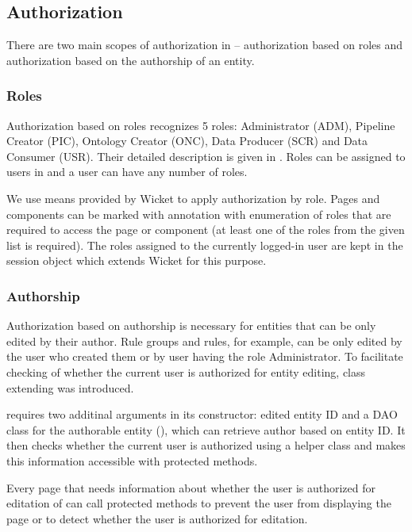 \begin{description}[style=nextline,font=\ttfamily]
\subsection{Authorization}
There are two main scopes of authorization in \odcs -- authorization based on roles and authorization based on the authorship of an entity.

\subsubsection{Roles}
Authorization based on roles recognizes 5 roles: Administrator (ADM), Pipeline Creator (PIC), Ontology Creator (ONC), Data Producer (SCR) and Data Consumer (USR). Their detailed description is given in . Roles can be assigned to users in \FE and a user can have any number of roles.

We use means provided by Wicket to apply authorization by role. Pages and components can be marked with  annotation with enumeration of roles that are required to access the page or component (at least one of the roles from the given list is required). The roles assigned to the currently logged-in user are kept in the session object  which extends Wicket  for this purpose.

\subsubsection{Authorship}
\label{sec:authorshipAuth}
Authorization based on authorship is necessary for entities that can be only edited by their author. Rule groups and rules, for example, can be only edited by the user who created them or by user having the role Administrator. To facilitate checking of whether the current user is authorized for entity editing, class  extending  was introduced.

 requires two additinal arguments in its constructor: edited entity ID and a DAO class for the authorable entity (), which can retrieve author based on entity ID. It then checks whether the current user is authorized using a helper class  and makes this information accessible with protected methods.

Every page that needs information about whether the user is authorized for editation of can call protected methods  to prevent the user from displaying the page or  to detect whether the user is authorized for editation.


\end{description}
